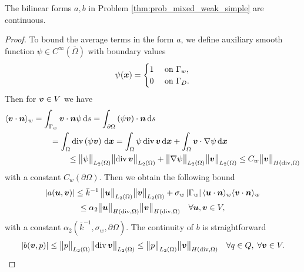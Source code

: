 
\begin{lemma} \label{lem:mixed_continuity_ab}
The bilinear forms $a,b$ in Problem \ref{thm:prob_mixed_weak_simple} are continuous.
\end{lemma}
\begin{proof}
To bound the average terms in the form $a$,
we define auxiliary smooth function $\psi\in C^{\infty}(\overbar\Omega)$ with boundary values
\begin{equation}
  \psi(\mathbf{\boldsymbol{x}}) =
  \begin{cases}
    1 & \textrm{ on } \Gamma_w, \\
    0 & \textrm{ on } \Gamma_D.
  \end{cases}
\end{equation}
Then for $\mathbf{\boldsymbol{v}}\in V$ we have
\begin{align}
  \langle\mathbf{\boldsymbol{v}} \cdot\mathbf{\boldsymbol{n}}\rangle_w = \int_{\Gamma_w} \mathbf{\boldsymbol{v}} \cdot\mathbf{\boldsymbol{n}} \psi \,{\rm d} s = 
    \int_{\partial\Omega} \left( \psi \mathbf{\boldsymbol{v}} \right) \cdot\mathbf{\boldsymbol{n}} \,{\rm d} s & \nonumber\\
    = \int_{\Omega} {\rm div}\left( \psi \mathbf{\boldsymbol{v}} \right) \,{\rm d}\mathbf{\boldsymbol{x}}
    = \int_{\Omega} \psi\, {\rm div}\, &\mathbf{\boldsymbol{v}} \,{\rm d}\mathbf{\boldsymbol{x}} + \int_{\Omega} \mathbf{\boldsymbol{v}} \cdot \nabla\psi \,{\rm d}\mathbf{\boldsymbol{x}} \nonumber\\
    \leq \bigl\Vert\psi\bigr\Vert_{L_2(\Omega)} \bigl\Vert{\rm div}\,\mathbf{\boldsymbol{v}}\bigr\Vert_{L_2(\Omega)}& + \bigl\Vert\nabla\psi\bigr\Vert_{L_2(\Omega)} \bigl\Vert\mathbf{\boldsymbol{v}}\bigr\Vert_{L_2(\Omega)}
    \leq C_w \bigl\Vert\mathbf{\boldsymbol{v}}\bigr\Vert_{H({\rm div},\Omega)}
\end{align}
with a constant $C_w(\partial\Omega)$. Then we obtain the following bound
\begin{multline} \label{eqn:form_a_bound}
    \abs{a(\vc u,\vc v)} \leq \overbar{k}^{-1}\, \norm{\vc u}_{L_2(\Omega)} \norm{\vc v}_{L_2(\Omega)}
        + \sigma_w \abs{\Gamma_w} \avg{\vc u\cdot\vc n}_w \avg{\vc v\cdot\vc n}_w\\
        \leq \alpha_2 \norm{\vc u}_{H(\div,\Omega)} \norm{\vc v}_{H(\div,\Omega)} \quad \forall \vc u,\vc v\in V,
\end{multline}
with a constant $\alpha_2 \left(\overbar{k}^{-1}, \sigma_w, \partial\Omega\right)$.
The continuity of $b$ is straightforward
\begin{equation} \label{eqn:form_b_bound}
    \left|b(\mathbf{\boldsymbol{v}},p)\right| \leq \bigl\Vert p\bigr\Vert_{L_2(\Omega)} \bigl\Vert{\rm div}\,\mathbf{\boldsymbol{v}}\bigr\Vert_{L_2(\Omega)}
        \leq \bigl\Vert p\bigr\Vert_{L_2(\Omega)} \bigl\Vert\mathbf{\boldsymbol{v}}\bigr\Vert_{H({\rm div},\Omega)} \quad \forall q\in Q,\;\forall \mathbf{\boldsymbol{v}}\in V.
\end{equation}
\end{proof}

